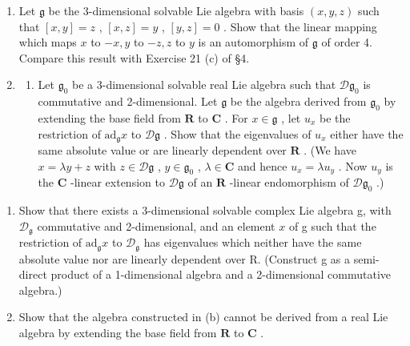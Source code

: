 \begin{enumerate}
\def\labelenumi{\arabic{enumi}.}
\setcounter{enumi}{6}
\item
  Let \(\mathfrak{g}\) be the 3-dimensional solvable Lie algebra with basis \((x,y,z)\) such that \([x,y] = z\) , \([x,z] = y\) , \([y,z] = 0\) . Show that the linear mapping which maps \(x\) to \(-x, y\) to \(-z, z\) to \(y\) is an automorphism of \(\mathfrak{g}\) of order 4. Compare this result with Exercise 21 (c) of §4.
\item
  \begin{enumerate}
  \def\labelenumii{(\alph{enumii})}
  \tightlist
  \item
    Let \(\mathfrak{g}_0\) be a 3-dimensional solvable real Lie algebra such that \(\mathcal{D}\mathfrak{g}_0\) is commutative and 2-dimensional. Let \(\mathfrak{g}\) be the algebra derived from \(\mathfrak{g}_0\) by extending the base field from \(\mathbf{R}\) to \(\mathbf{C}\) . For \(x \in \mathfrak{g}\) , let \(u_x\) be the restriction of \(\mathrm{ad}_{\mathfrak{g}}x\) to \(\mathcal{D}\mathfrak{g}\) . Show that the eigenvalues of \(u_x\) either have the same absolute value or are linearly dependent over \(\mathbf{R}\) . (We have \(x = \lambda y + z\) with \(z \in \mathcal{D}\mathfrak{g}\) , \(y \in \mathfrak{g}_0\) , \(\lambda \in \mathbf{C}\) and hence \(u_x = \lambda u_y\) . Now \(u_y\) is the \(\mathbf{C}\) -linear extension to \(\mathcal{D}\mathfrak{g}\) of an \(\mathbf{R}\) -linear endomorphism of \(\mathcal{D}\mathfrak{g}_{0}\) .)
  \end{enumerate}
\end{enumerate}

\begin{enumerate}
\def\labelenumi{(\alph{enumi})}
\setcounter{enumi}{1}
\item
  Show that there exists a 3-dimensional solvable complex Lie algebra g, with \(\mathcal{D}_{\mathfrak{g}}\) commutative and 2-dimensional, and an element \(x\) of g such that the restriction of \(\mathrm{ad}_{\mathfrak{g}}x\) to \(\mathcal{D}_{\mathfrak{g}}\) has eigenvalues which neither have the same absolute value nor are linearly dependent over R. (Construct g as a semi-direct product of a 1-dimensional algebra and a 2-dimensional commutative algebra.)
\item
  Show that the algebra constructed in (b) cannot be derived from a real Lie algebra by extending the base field from \(\mathbf{R}\) to \(\mathbf{C}\) .
\end{enumerate}

